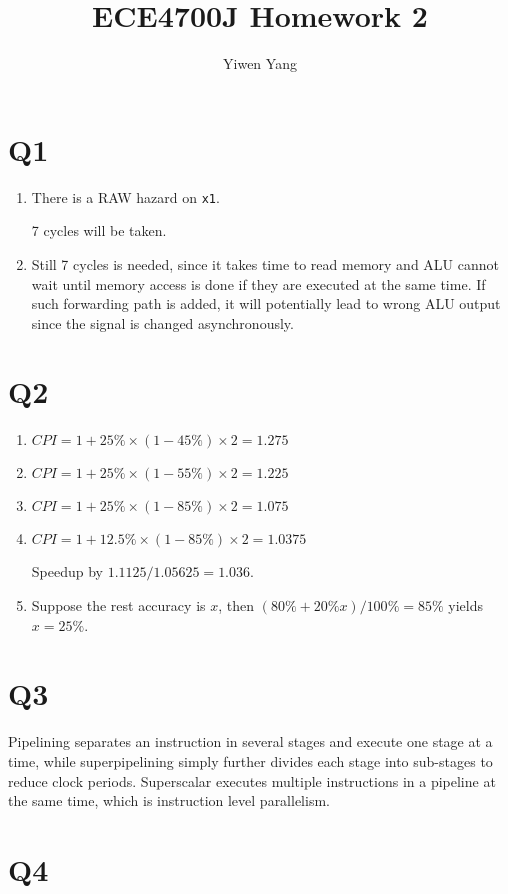 \documentclass[12pt]{article}
\title{ECE4700J Homework 2}
\author{Yiwen Yang}
\begin{document}
\date{}
\maketitle

\section*{Q1}

\begin{enumerate}
	\item
		There is a RAW hazard on \texttt{x1}.

		7 cycles will be taken.
	\item
		Still 7 cycles is needed, since it takes time to read memory and ALU cannot wait until memory access is done if they are executed at the same time. If such forwarding path is added, it will potentially lead to wrong ALU output since the signal is changed asynchronously.
\end{enumerate}

\section*{Q2}

\begin{enumerate}
	\item
		$CPI=1+25\%\times (1-45\%)\times 2=1.275$
	\item
		$CPI=1+25\%\times (1-55\%)\times 2=1.225$
	\item
		$CPI=1+25\%\times (1-85\%)\times 2=1.075$
	\item
		$CPI=1+12.5\%\times (1-85\%)\times 2=1.0375$

		Speedup by $1.1125/1.05625=1.036$.
	\item
		Suppose the rest accuracy is $x$, then $(80\%+20\%x)/100\%=85\%$ yields $x=25\%$.
\end{enumerate}

\section*{Q3}

Pipelining separates an instruction in several stages and execute one stage at a time, while superpipelining simply further divides each stage into sub-stages to reduce clock periods. Superscalar executes multiple instructions in a pipeline at the same time, which is instruction level parallelism. 

\newpage
\section*{Q4}
\end{document}
